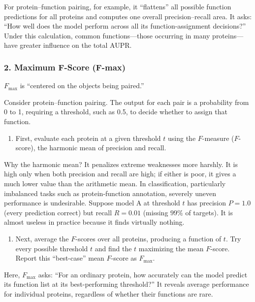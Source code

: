 For protein--function pairing, for example, it ``flattens'' all possible function predictions for all proteins and computes one overall precision--recall area. It asks: ``How well does the model perform across all its function-assignment decisions?'' Under this calculation, common functions---those occurring in many proteins---have greater influence on the total AUPR.

\hypertarget{maximum-f-score-f-max}{%
\subsubsection{2. Maximum F-Score (F-max)}\label{maximum-f-score-f-max}}

\(F_{\max}\) is ``centered on the objects being paired.''

Consider protein--function pairing. The output for each pair is a probability from 0 to 1, requiring a threshold, such as 0.5, to decide whether to assign that function.

\begin{enumerate}
\def\labelenumi{(\arabic{enumi})}
\tightlist
\item
  First, evaluate each protein at a given threshold \(t\) using the \(F\)-measure (\(F\)-score), the harmonic mean of precision and recall.
\end{enumerate}

Why the harmonic mean? It penalizes extreme weaknesses more harshly. It is high only when both precision and recall are high; if either is poor, it gives a much lower value than the arithmetic mean. In classification, particularly imbalanced tasks such as protein-function annotation, severely uneven performance is undesirable. Suppose model A at threshold \(t\) has precision \(P=1.0\) (every prediction correct) but recall \(R=0.01\) (missing \(99\%\) of targets). It is almost useless in practice because it finds virtually nothing.

\begin{enumerate}
\def\labelenumi{(\arabic{enumi})}
\setcounter{enumi}{1}
\tightlist
\item
  Next, average the \(F\)-scores over all proteins, producing a function of \(t\). Try every possible threshold \(t\) and find the \(t\) maximizing the mean \(F\)-score. Report this ``best-case'' mean \(F\)-score as \(F_{\max}\).
\end{enumerate}

Here, \(F_{\max}\) asks: ``For an ordinary protein, how accurately can the model predict its function list at its best-performing threshold?'' It reveals average performance for individual proteins, regardless of whether their functions are rare.

